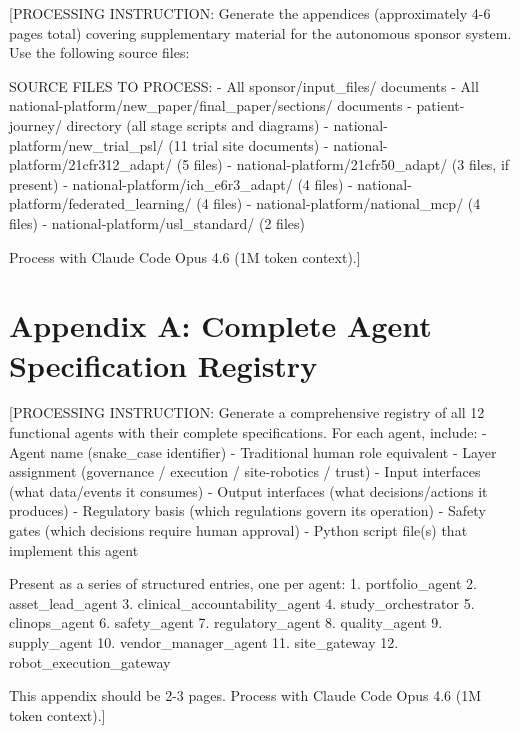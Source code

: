 
[PROCESSING INSTRUCTION: Generate the appendices (approximately 4-6 pages total) covering
supplementary material for the autonomous sponsor system. Use the following source files:

SOURCE FILES TO PROCESS:
- All sponsor/input\_files/ documents
- All national-platform/new\_paper/final\_paper/sections/ documents
- patient-journey/ directory (all stage scripts and diagrams)
- national-platform/new\_trial\_psl/ (11 trial site documents)
- national-platform/21cfr312\_adapt/ (5 files)
- national-platform/21cfr50\_adapt/ (3 files, if present)
- national-platform/ich\_e6r3\_adapt/ (4 files)
- national-platform/federated\_learning/ (4 files)
- national-platform/national\_mcp/ (4 files)
- national-platform/usl\_standard/ (2 files)

Process with Claude Code Opus 4.6 (1M token context).]

\section*{Appendix A: Complete Agent Specification Registry}

[PROCESSING INSTRUCTION: Generate a comprehensive registry of all 12 functional agents
with their complete specifications. For each agent, include:
- Agent name (snake\_case identifier)
- Traditional human role equivalent
- Layer assignment (governance / execution / site-robotics / trust)
- Input interfaces (what data/events it consumes)
- Output interfaces (what decisions/actions it produces)
- Regulatory basis (which regulations govern its operation)
- Safety gates (which decisions require human approval)
- Python script file(s) that implement this agent

Present as a series of structured entries, one per agent:
1. portfolio\_agent
2. asset\_lead\_agent
3. clinical\_accountability\_agent
4. study\_orchestrator
5. clinops\_agent
6. safety\_agent
7. regulatory\_agent
8. quality\_agent
9. supply\_agent
10. vendor\_manager\_agent
11. site\_gateway
12. robot\_execution\_gateway

This appendix should be 2-3 pages. Process with Claude Code Opus 4.6 (1M token context).]

